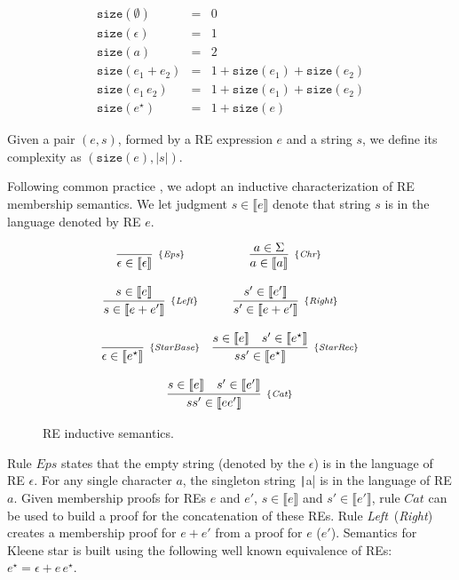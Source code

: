 \documentclass[review]{elsarticle}
\newcommand{\Eps}{\textit{Eps}}
\newcommand{\Chr}{\textit{Chr}}
\newcommand{\Catt}{\textit{Cat}}
\newcommand{\Left}{\textit{Left}}
\newcommand{\Right}{\textit{Right}}
\newcommand{\StarBase}{\textit{StarBase}}
\newcommand{\StarRec}{\textit{StarRec}}
\newcommand{\sembrackets}[1]{\ensuremath{\llbracket #1 \rrbracket}}
\newcommand{\size}{\ensuremath{\texttt{size}}}
\newcommand{\coq}[1]{\texttt|#1|}
\theoremstyle{definition}
\begin{document}
\[
\begin{array}{lcl}
   \size(\emptyset) & = & 0 \\
   \size(\epsilon)  & = & 1 \\
   \size(a)         & = & 2 \\
   \size(e_1 + e_2) & = & 1 + \size(e_1) + \size(e_2)\\
   \size(e_1\,e_2)  & = & 1 + \size(e_1) + \size(e_2)\\
   \size(e ^\star)  & = & 1 + \size(e)
\end{array}
\]

Given a pair $(e,s)$, formed by a RE expression $e$ and a string $s$, we define its complexity as
$(\size(e),|s|)$. 

Following common practice \cite{Lopes2016,Ribeiro2017,Rathnayake2011}, we adopt an inductive
characterization of RE membership semantics. We let judgment $s \in \sembrackets{e}$ denote
that string $s$ is in the language denoted by RE $e$.

\begin{figure}[h]
	\[
	\begin{array}{cc}
	\infer[_{\{\Eps\}}]
	{\epsilon \in \sembrackets{\epsilon}}{} &
	\infer[_{\{\Chr\}}]
	{a \in \sembrackets{a}}{a \in \Sigma} \\ \\
	\infer[_{\{\Left\}}]
	{s \in \sembrackets{e + e'}}{s \in \sembrackets{e}} &
	\infer[_{\{\Right\}}]
	{s' \in \sembrackets{e + e'}}{s' \in \sembrackets{e'}} \\ \\
	\infer[_{\{\StarBase\}}]
	{\epsilon \in \sembrackets{e^\star}}{} &
	\infer[_{\{\StarRec\}}]
	{ss' \in \sembrackets{e^\star}}
	{s \in \sembrackets{e} & s' \in \sembrackets{e^\star}} \\ \\
	\multicolumn{2}{c}{
		\infer[_{\{\Catt\}}]
		{ss' \in \sembrackets{ee'}}
		{s \in \sembrackets{e} & s' \in \sembrackets{e'}}
	} \\
	\end{array}
	\]
	\centering
	\caption{RE inductive semantics.}
	\label{figure:resemantics}
\end{figure}

Rule $\Eps$ states that the empty string (denoted by the $\epsilon$)
is in the language of RE $\epsilon$. For any single character $a$, the singleton
string \coq{a} is in the language 
of RE $a$. Given membership proofs for REs $e$ and $e'$, $s \in \sembrackets{e}$ 
and $s' \in\sembrackets{e'}$, rule $\Catt$ can be used to build a proof
for the concatenation of these REs.  Rule \Left~(\Right) creates a membership proof
for $e + e'$ from a proof for $e$ ($e'$). Semantics for Kleene star
is built using the following well known equivalence of REs: $e^\star
= \epsilon + e\,e^\star$. 
\end{document}
